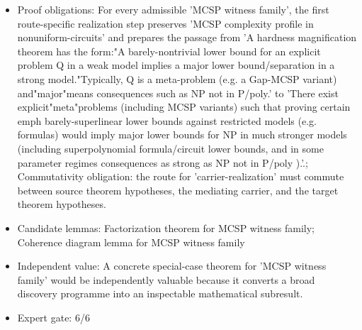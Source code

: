 \documentclass[11pt]{article}
\begin{document}
\begin{itemize}
\item Proof obligations: For every admissible 'MCSP witness family', the first route-specific realization step preserves 'MCSP complexity profile in nonuniform-circuits' and prepares the passage from 'A hardness magnification theorem has the form:"A barely-nontrivial lower bound for an explicit problem Q in a weak model implies a major lower bound/separation in a strong model."Typically, Q is a meta-problem (e.g. a Gap-MCSP variant) and"major"means consequences such as NP not in P/poly.' to 'There exist explicit"meta"problems (including MCSP variants) such that proving certain emph barely-superlinear lower bounds against restricted models (e.g. formulas) would imply major lower bounds for NP in much stronger models (including superpolynomial formula/circuit lower bounds, and in some parameter regimes consequences as strong as NP not in P/poly ).'.; Commutativity obligation: the route for 'carrier-realization' must commute between source theorem hypotheses, the mediating carrier, and the target theorem hypotheses.
\item Candidate lemmas: Factorization theorem for MCSP witness family; Coherence diagram lemma for MCSP witness family
\item Independent value: A concrete special-case theorem for 'MCSP witness family' would be independently valuable because it converts a broad discovery programme into an inspectable mathematical subresult.
\item Expert gate: 6/6
\end{itemize}
\end{document}
